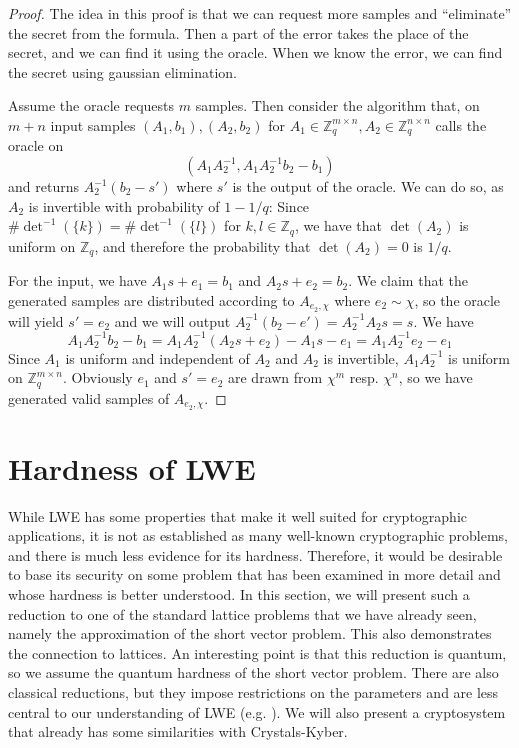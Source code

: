 \documentclass{report}
\newcommand{\Z}{\mathbb{Z}}
\begin{document}
\begin{proof}
The idea in this proof is that we can request more samples and ``eliminate'' the secret from the formula. Then a part of the error takes the place of the secret, and we can find it using the oracle. When we know the error, we can find the secret using gaussian elimination.

Assume the oracle requests $m$ samples. Then consider the algorithm that, on $m + n$ input samples $(A_1, b_1), (A_2, b_2)$ for $A_1 \in \Z_q^{m \times n}, A_2 \in \Z_q^{n \times n}$ calls the oracle on 
\begin{equation}
(A_1 A_2^{-1}, A_1 A_2^{-1} b_2 - b_1) \nonumber
\end{equation} and returns $A_2^{-1} (b_2 - s')$ where $s'$ is the output of the oracle. We can do so, as $A_2$ is invertible with probability of $1 - 1/q$: Since $\#\det^{-1}(\{k\}) = \#\det^{-1}(\{l\})$ for $k, l \in \Z_q$, we have that $\det(A_2)$ is uniform on $\Z_q$, and therefore the probability that $\det(A_2) = 0$ is $1/q$.

For the input, we have $A_1 s + e_1 = b_1$ and $A_2 s + e_2 = b_2$. We claim that the generated samples are distributed according to $A_{e_2, \chi}$ where $e_2 \sim \chi$, so the oracle will yield $s' = e_2$ and we will output $A_2^{-1} (b_2 - e') = A_2^{-1} A_2 s = s$. We have
\begin{equation}
A_1 A_2^{-1} b_2 - b_1 = A_1 A_2^{-1} (A_2 s + e_2) - A_1 s - e_1 = A_1 A_2^{-1} e_2 - e_1 \nonumber
\end{equation}
Since $A_1$ is uniform and independent of $A_2$ and $A_2$ is invertible, $A_1 A_2^{-1}$ is uniform on $\Z_q^{m \times n}$. Obviously $e_1$ and $s' = e_2$ are drawn from $\chi^m$ resp. $\chi^n$, so we have generated valid samples of $A_{e_2, \chi}$. \qedhere
\end{proof}


\chapter{Hardness of LWE}

\motivation
While LWE has some properties that make it well suited for cryptographic applications, it is not as established as many well-known cryptographic problems, and there is much less evidence for its hardness. Therefore, it would be desirable to base its security on some problem that has been examined in more detail and whose hardness is better understood. In this section, we will present such a reduction to one of the standard lattice problems that we have already seen, namely the approximation of the short vector problem. This also demonstrates the connection to lattices. An interesting point is that this reduction is quantum, so we assume the quantum hardness of the short vector problem. There are also classical reductions, but they impose restrictions on the parameters and are less central to our understanding of LWE (e.g. \cite{ClassicalReduction}). We will also present a cryptosystem that already has some similarities with Crystals-Kyber.
\end{document}
